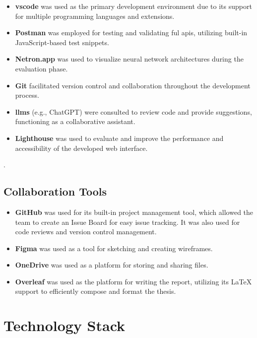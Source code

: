 \begin{itemize}
    \item \textbf{\acrlong{vscode}} was used as the primary development environment due to its support for multiple programming languages and extensions.
\item \textbf{Postman} was employed for testing and validating ful \glspl{api}, utilizing built-in JavaScript-based test snippets.
\item \textbf{Netron.app} was used to visualize neural network architectures during the evaluation phase.
\item \textbf{Git} facilitated version control and collaboration throughout the development process.
\item \textbf{\glspl{llm}} (e.g., ChatGPT) were consulted to review code and provide suggestions, functioning as a collaborative assistant.
\item \textbf{Lighthouse} was used to evaluate and improve the performance and accessibility of the developed web interface.
\end{itemize}.

\subsection*{Collaboration Tools}
\label{subsec:collaboration-and-design-tools}

\begin{itemize}
    \item \textbf{GitHub} was used for its built-in project management tool, which allowed the team to create an Issue Board for easy issue tracking. It was also used for code reviews and version control management.
    
    \item \textbf{Figma} was used as a tool for sketching and creating wireframes.
    
    \item \textbf{OneDrive} was used as a platform for storing and sharing files.
    
    \item \textbf{Overleaf} was used as the platform for writing the report, utilizing its LaTeX support to efficiently compose and format the thesis.
\end{itemize}


\section{Technology Stack}
\label{sec:technology-stack}

